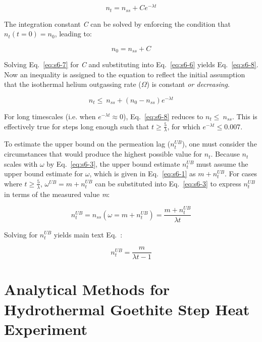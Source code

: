 \begin{equation}
n_{t} = n_{ss} + Ce^{- \lambda t}
\label{eq:s6-6}
\end{equation}

The integration constant \emph{C} can be solved by enforcing the
condition that \(n_{t}(t = 0) = n_{0}\), leading to:

\begin{equation}
n_{0} = n_{ss} + C
\label{eq:s6-7}
\end{equation}

Solving Eq.~\eqref{eq:s6-7} for \emph{C} and substituting into Eq.~\eqref{eq:s6-6} yields
Eq.~\eqref{eq:s6-8}. Now an inequality is assigned to the equation to reflect the
initial assumption that the isothermal helium outgassing rate
(\(\Omega\)) is constant \emph{or decreasing}.

\begin{equation}
n_{t} \leq \ n_{ss} + \left( n_{0} - n_{ss} \right)e^{- \lambda t}
\label{eq:s6-8}
\end{equation}

For long timescales (i.e. when \(e^{- \lambda t} \approx 0\)), Eq.~\eqref{eq:s6-8}
reduces to \(n_{t} \leq \ n_{ss}\). This is effectively true for steps
long enough such that \(t \geq \frac{5}{\lambda}\), for which
\(e^{- \lambda t} \leq 0.007.\) 

To estimate the upper bound on the permeation lag (\(n_{t}^{UB}\)), one
must consider the circumstances that would produce the highest possible
value for \(n_{t}\). Because
\(n_{t}\) scales with $\omega$ by Eq.~\eqref{eq:s6-3}, the upper bound estimate
\(n_{t}^{UB}\) must assume the upper bound estimate for $\omega$, which is
given in Eq.~\eqref{eq:s6-1} as \({m + n}_{t}^{UB}\). For cases where $t \geq \frac{5}{\lambda}$, \(\omega^{UB} = {m + n}_{t}^{UB}\) can be substituted into Eq.~\eqref{eq:s6-3} to express
\(n_{t}^{UB}\) in terms of the measured value \emph{m}:

\[
n_{t}^{UB} = n_{ss}(\omega = m + n_{t}^{UB}) = \frac{m + n_{t}^{UB}}{\lambda t}
\]

Solving for \(n_{t}^{UB}\) yields main text Eq.~\MainEqSteadystate : 

\begin{equation}
n_{t}^{UB} = \frac{m}{\lambda t - 1}
\label{eq:6}
\end{equation}

\section{Analytical Methods for Hydrothermal Goethite Step Heat Experiment}\label{sec:si-analytical-methods}

